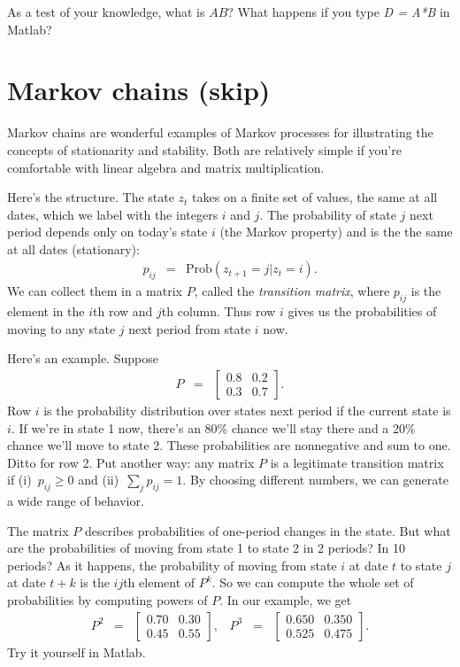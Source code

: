 \documentclass[11pt]{article}
\begin{document}
As a test of your knowledge, what is $A B$?
What happens if you type {\it D = A*B} in Matlab?


\section{Markov chains (skip)}

Markov chains are wonderful examples of Markov processes
for illustrating the concepts of stationarity and stability.
Both are relatively simple if you're comfortable with linear algebra
and matrix multiplication.


Here's the structure.
The state $z_t$ takes on a finite set of values, the same at all dates,
which we label with the integers $i$ and $j$.
The probability of state $j$ next period depends only on today's state $i$
(the Markov property) and is the the same at all dates (stationary):
\begin{eqnarray*}
    p_{ij} &=& \mbox{Prob} (z_{t+1} = j | z_t = i) .
\end{eqnarray*}
We can collect them in a matrix $P$, called the {\it transition matrix\/},
where $p_{ij}$ is the element in the $i$th row and $j$th column.
Thus  row $i$ gives us the probabilities of moving to any state $j$
next period from state $i$ now.

Here's an example.  Suppose
\begin{eqnarray*}
    P &=& \left[
            \begin{array}{cc}
            0.8 & 0.2 \\  0.3 & 0.7
            \end{array}
            \right] .
\end{eqnarray*}
Row $i$ is the probability distribution over states next period
if the current state is $i$.
If we're in state 1 now, there's an 80\% chance we'll stay there
and a 20\% chance we'll move to state 2.
These probabilities are nonnegative and sum to one.
Ditto for row 2.
Put another way:  any matrix $P$ is a legitimate transition matrix
if (i)~$p_{ij} \geq 0$ and (ii)~$\sum_j p_{ij} = 1$.
By choosing different numbers, we can generate a wide range of behavior.


The matrix $P$ describes probabilities of one-period changes in the state.
But what are the probabilities of moving from state 1 to state 2 in 2 periods?
In 10 periods?
As it happens, the probability of moving from state $i$ at date $t$ to state $j$
at date $t+k$ is the $ij$th element of $P^k$.
So we can compute the whole set of probabilities by computing powers of $P$.
In our example, we get
\begin{eqnarray*}
    P^2 &=& \left[
            \begin{array}{cc}
            0.70 & 0.30 \\  0.45 & 0.55
            \end{array}
            \right] , \;\;\;
    P^3 \;\;=\;\; \left[
            \begin{array}{cc}
            0.650 & 0.350 \\  0.525 & 0.475
            \end{array}
            \right] .
\end{eqnarray*}
Try it yourself in Matlab.
\end{document}
